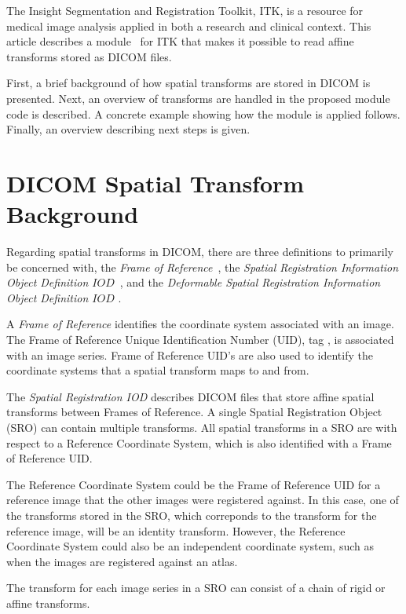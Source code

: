 \documentclass{InsightArticle}
\begin{document}
The Insight Segmentation and Registration Toolkit, ITK, is a resource for
medical image analysis applied in both a research and clinical context. This
article describes a module~\cite{ITKModules} for ITK that makes it possible to read affine
transforms stored as DICOM files.

First, a brief background of how spatial transforms are stored in DICOM is
presented. Next, an overview of transforms are handled in the proposed module
code is described. A concrete example showing how the module is applied
follows.  Finally, an overview describing next steps is given.


\section{DICOM Spatial Transform Background}

Regarding spatial transforms in DICOM, there are three definitions to
primarily be concerned with, the \textit{Frame of
Reference}~\cite{DICOMFrameOfReference}, the \textit{Spatial Registration
Information Object Definition \(IOD\)}~\cite{DICOMSRO,DICOMSROSupp}, and the
\textit{Deformable Spatial Registration Information Object Definition \(IOD\)}
\cite{DICOMSRO,DICOMDSROSupp}.

A \textit{Frame of Reference} identifies the coordinate system associated with
an image. The Frame of Reference Unique Identification Number (UID), tag
, is associated with an image series. Frame of Reference
UID's are also used to identify the coordinate systems that a spatial
transform maps to and from.

The \textit{Spatial Registration IOD} describes DICOM files that store affine
spatial transforms between Frames of Reference. A single Spatial Registration
Object (SRO) can contain multiple transforms. All spatial transforms in a
SRO are with respect to a Reference Coordinate System, which is also
identified with a Frame of Reference UID.

The Reference Coordinate System could be the Frame of Reference UID for a
reference image that the other images were registered against. In this case,
one of the transforms stored in the SRO, which correponds to the transform for
the reference image, will be an identity transform. However, the Reference
Coordinate System could also be an independent coordinate system, such as when
the images are registered against an atlas.

The transform for each image series in a SRO can consist of a chain of rigid
or affine transforms.
\end{document}
